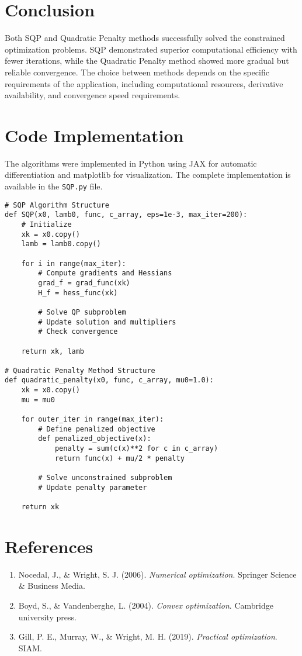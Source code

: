 \documentclass[11pt,a4paper]{article}
\begin{document}
\section{Conclusion}
Both SQP and Quadratic Penalty methods successfully solved the constrained optimization problems. SQP demonstrated superior computational efficiency with fewer iterations, while the Quadratic Penalty method showed more gradual but reliable convergence. The choice between methods depends on the specific requirements of the application, including computational resources, derivative availability, and convergence speed requirements.

\section{Code Implementation}
The algorithms were implemented in Python using JAX for automatic differentiation and matplotlib for visualization. The complete implementation is available in the \texttt{SQP.py} file.

\begin{lstlisting}[caption=Key Algorithm Components]
# SQP Algorithm Structure
def SQP(x0, lamb0, func, c_array, eps=1e-3, max_iter=200):
    # Initialize
    xk = x0.copy()
    lamb = lamb0.copy()
    
    for i in range(max_iter):
        # Compute gradients and Hessians
        grad_f = grad_func(xk)
        H_f = hess_func(xk)
        
        # Solve QP subproblem
        # Update solution and multipliers
        # Check convergence
        
    return xk, lamb

# Quadratic Penalty Method Structure  
def quadratic_penalty(x0, func, c_array, mu0=1.0):
    xk = x0.copy()
    mu = mu0
    
    for outer_iter in range(max_iter):
        # Define penalized objective
        def penalized_objective(x):
            penalty = sum(c(x)**2 for c in c_array)
            return func(x) + mu/2 * penalty
            
        # Solve unconstrained subproblem
        # Update penalty parameter
        
    return xk
\end{lstlisting}

\section{References}
\begin{enumerate}
    \item Nocedal, J., \& Wright, S. J. (2006). \textit{Numerical optimization}. Springer Science \& Business Media.
    \item Boyd, S., \& Vandenberghe, L. (2004). \textit{Convex optimization}. Cambridge university press.
    \item Gill, P. E., Murray, W., \& Wright, M. H. (2019). \textit{Practical optimization}. SIAM.
\end{enumerate}
\end{document}
